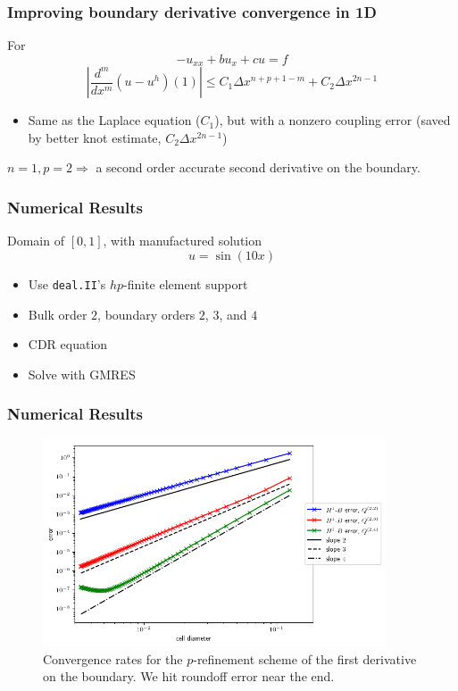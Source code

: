 \documentclass[8pt]{beamer}
\begin{document}
\begin{frame}
    \frametitle{Improving boundary derivative convergence in 1D}
    For
    \begin{equation*}
        -u_{xx} + b u_x + c u = f
    \end{equation*}
    \pause
    \begin{equation*}
        \left|\dfrac{d^m}{dx^m}(u - u^h)(1)\right|
        \leq C_1 \Delta x^{n + p + 1 - m}
        + C_2 \Delta x^{2 n - 1}
    \end{equation*}
    \pause
    \begin{itemize}
        \item Same as the Laplace equation (\(C_1\)), but with a nonzero coupling error
              (saved by better knot estimate, \(C_2 \Delta x^{2 n - 1}\))
    \end{itemize}
    \pause
    \begin{center}
        \(n = 1, p = 2 \Rightarrow\) a second order accurate second derivative
        on the boundary.
    \end{center}
\end{frame}

\begin{frame}
    \frametitle{Numerical Results}
    Domain of \([0, 1]\), with manufactured solution
    \begin{equation*}
        u = \sin(10 x)
    \end{equation*}
    \begin{itemize}
        \item Use \texttt{deal.II}'s \(hp\)-finite element support
        \item Bulk order \(2\), boundary orders \(2\), \(3\), and \(4\)
        \item CDR equation
        \item Solve with GMRES
    \end{itemize}
\end{frame}

\begin{frame}
    \frametitle{Numerical Results}
    \begin{figure}
        \centering
        \includegraphics[width=4in]{Pictures/oned-cdr-2-h1-errors.png}

        \caption{Convergence rates for the \(p\)-refinement scheme of the
        first derivative on the boundary. We hit roundoff error near the end.}
    \end{figure}
\end{frame}
\end{document}
